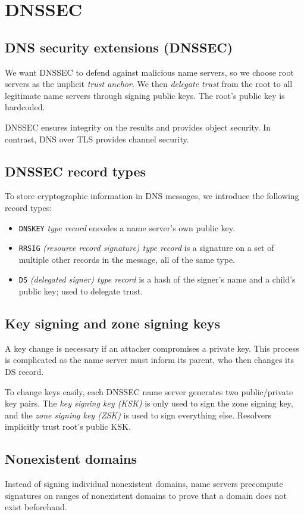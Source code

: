 \chapter{DNSSEC}

\section{DNS security extensions (DNSSEC)}
We want DNSSEC to defend against malicious name servers, so we choose root servers as the implicit \emph{trust anchor}. We then \emph{delegate trust} from the root to all legitimate name servers through signing public keys. The root's public key is hardcoded.

\medskip
DNSSEC ensures integrity on the results and provides object security. In contrast, DNS over TLS provides channel security.

\section{DNSSEC record types}
To store cryptographic information in DNS messages, we introduce the following record types:
\begin{itemize}
    \item \texttt{DNSKEY} \emph{type record} encodes a name server's own public key.
    \item \texttt{RRSIG} \emph{(resource record signature) type record} is a signature on a set of multiple other records in the message, all of the same type.
    \item \texttt{DS} \emph{(delegated signer) type record} is a hash of the signer’s name and a child’s public key; used to delegate trust.
\end{itemize}

\section{Key signing and zone signing keys}
A key change is necessary if an attacker compromises a private key. This process is complicated as the name server must inform its parent, who then changes its DS record. 

\medskip
To change keys easily, each DNSSEC name server generates two public/private key pairs. The \emph{key signing key (KSK)} is only used to sign the zone signing key, and the \emph{zone signing key (ZSK)} is used to sign everything else. Resolvers implicitly trust root's public KSK.

\section{Nonexistent domains}
Instead of signing individual nonexistent domains, name servers precompute signatures on ranges of nonexistent domains to prove that a domain does not exist beforehand.

